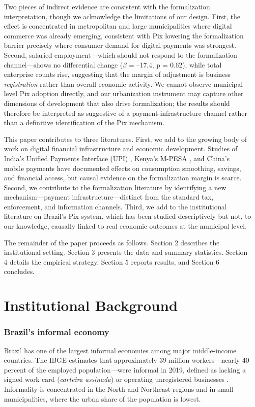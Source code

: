 \documentclass[12pt]{article}
\begin{document}
Two pieces of indirect evidence are consistent with the formalization interpretation, though we acknowledge the limitations of our design. First, the effect is concentrated in metropolitan and large municipalities where digital commerce was already emerging, consistent with Pix lowering the formalization barrier precisely where consumer demand for digital payments was strongest. Second, salaried employment---which should not respond to the formalization channel---shows no differential change ($\beta$ = --17.4, p = 0.62), while total enterprise counts rise, suggesting that the margin of adjustment is business \textit{registration} rather than overall economic activity. We cannot observe municipal-level Pix adoption directly, and our urbanization instrument may capture other dimensions of development that also drive formalization; the results should therefore be interpreted as suggestive of a payment-infrastructure channel rather than a definitive identification of the Pix mechanism.

This paper contributes to three literatures. First, we add to the growing body of work on digital financial infrastructure and economic development. Studies of India's Unified Payments Interface (UPI) \citep{patnam2023digital}, Kenya's M-PESA \citep{suri2017longrun, jack2014risk}, and China's mobile payments \citep{huang2020mobile} have documented effects on consumption smoothing, savings, and financial access, but causal evidence on the formalization margin is scarce. Second, we contribute to the formalization literature \citep{depaula2014informality, ulyssea2020informality, bruhn2011entrepreneurship, monteiro2012coming} by identifying a new mechanism---payment infrastructure---distinct from the standard tax, enforcement, and information channels. Third, we add to the institutional literature on Brazil's Pix system, which has been studied descriptively \citep{bcb2023pix} but not, to our knowledge, causally linked to real economic outcomes at the municipal level.

The remainder of the paper proceeds as follows. Section 2 describes the institutional setting. Section 3 presents the data and summary statistics. Section 4 details the empirical strategy. Section 5 reports results, and Section 6 concludes.

\section{Institutional Background}

\subsubsection*{Brazil's informal economy} Brazil has one of the largest informal economies among major middle-income countries. The IBGE estimates that approximately 39 million workers---nearly 40 percent of the employed population---were informal in 2019, defined as lacking a signed work card (\textit{carteira assinada}) or operating unregistered businesses \citep{ibge2020pnad}. Informality is concentrated in the North and Northeast regions and in small municipalities, where the urban share of the population is lowest.
\end{document}
